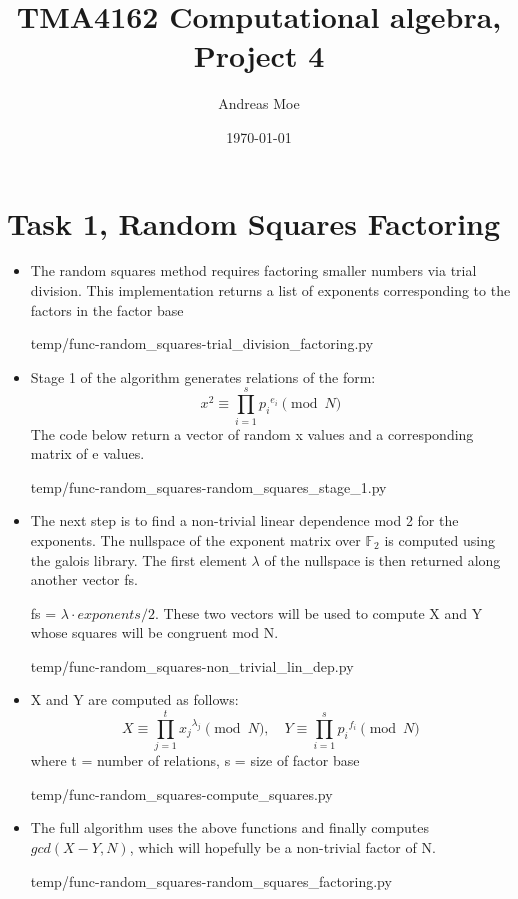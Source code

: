 \documentclass[12pt,a4paper]{article}
\title{TMA4162 Computational algebra, Project 4}
\author{Andreas Moe}
\date{\today}
\begin{document}
\maketitle

\section*{Task 1, Random Squares Factoring}
\begin{itemize}
    \setlength{\itemsep}{2em}
    \item
    The random squares method requires factoring smaller numbers via trial division.
    This implementation returns a list of exponents corresponding to the factors in the factor base
    
    {temp/func-random_squares-trial_division_factoring.py}
    \item
    Stage 1 of the algorithm generates relations of the form:
    \[x^2 \equiv \prod_{i=1}^s {p_i}^{e_i} \pmod{N}\]
    The code below return a vector of random x values and a corresponding matrix of e values.
    
    {temp/func-random_squares-random_squares_stage_1.py}
    \item
    The next step is to find a non-trivial linear dependence mod 2 for the exponents.
    The nullspace of the exponent matrix over \(\mathbb{F}_2\) is computed using the galois library.
    The first element \(\lambda\) of the nullspace is then returned along another vector fs.

    fs = \(\lambda\cdot exponents / 2\).
    These two vectors will be used to compute X and Y whose squares will be congruent mod N.
    
    {temp/func-random_squares-non_trivial_lin_dep.py}
    \item
    X and Y are computed as follows:
    \[X \equiv \prod_{j=1}^{t} {x_j}^{\lambda_j} \pmod{N}, \quad Y \equiv \prod_{i=1}^{s} {p_i}^{f_i} \pmod{N}\]
    where t = number of relations, s = size of factor base
    
    {temp/func-random_squares-compute_squares.py}
    \item
    The full algorithm uses the above functions and finally computes \(gcd(X-Y, N)\), which will hopefully be a
    non-trivial factor of N.
    
    {temp/func-random_squares-random_squares_factoring.py}
\end{itemize}
\end{document}
